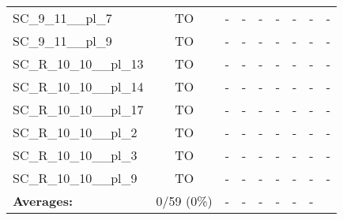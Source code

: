 \documentclass{article}
\begin{document}
\begin{tabular}{lcccccccc}
SC\_9\_11\_\_pl\_7 & TO & - & - & - & - & - & - & - \\
SC\_9\_11\_\_pl\_9 & TO & - & - & - & - & - & - & - \\
SC\_R\_10\_10\_\_pl\_13 & TO & - & - & - & - & - & - & - \\
SC\_R\_10\_10\_\_pl\_14 & TO & - & - & - & - & - & - & - \\
SC\_R\_10\_10\_\_pl\_17 & TO & - & - & - & - & - & - & - \\
SC\_R\_10\_10\_\_pl\_2 & TO & - & - & - & - & - & - & - \\
SC\_R\_10\_10\_\_pl\_3 & TO & - & - & - & - & - & - & - \\
SC\_R\_10\_10\_\_pl\_9 & TO & - & - & - & - & - & - & - \\
\textbf{Averages:} & 0/59 (0\%) & - & - & - & - & - & - & \\
\bottomrule
\end{tabular}
\\[0.7cm]
\end{document}
